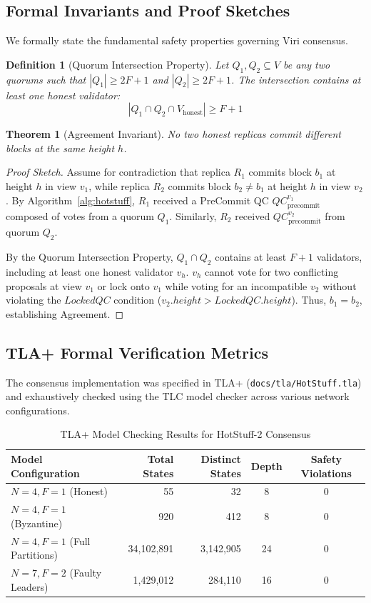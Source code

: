 \documentclass[10pt,journal,compsoc,twocolumn]{IEEEtran}
\newtheorem{theorem}{Theorem}
\newtheorem{definition}{Definition}
\begin{document}
\subsection{Formal Invariants and Proof Sketches}
We formally state the fundamental safety properties governing Viri consensus.

\begin{definition}[Quorum Intersection Property]
Let $Q_1, Q_2 \subseteq V$ be any two quorums such that $|Q_1| \ge 2F+1$ and $|Q_2| \ge 2F+1$. The intersection contains at least one honest validator:
\begin{equation}
|Q_1 \cap Q_2 \cap V_{\text{honest}}| \ge F + 1
\end{equation}
\end{definition}

\begin{theorem}[Agreement Invariant]
No two honest replicas commit different blocks at the same height $h$.
\end{theorem}
\begin{proof}[Proof Sketch]
Assume for contradiction that replica $R_1$ commits block $b_1$ at height $h$ in view $v_1$, while replica $R_2$ commits block $b_2 \neq b_1$ at height $h$ in view $v_2$. By Algorithm~\ref{alg:hotstuff}, $R_1$ received a PreCommit QC $QC_{\text{precommit}}^{v_1}$ composed of votes from a quorum $Q_1$. Similarly, $R_2$ received $QC_{\text{precommit}}^{v_2}$ from quorum $Q_2$. 

By the Quorum Intersection Property, $Q_1 \cap Q_2$ contains at least $F+1$ validators, including at least one honest validator $v_h$. $v_h$ cannot vote for two conflicting proposals at view $v_1$ or lock onto $v_1$ while voting for an incompatible $v_2$ without violating the $LockedQC$ condition ($v_2.height > LockedQC.height$). Thus, $b_1 = b_2$, establishing Agreement.
\end{proof}

\subsection{TLA+ Formal Verification Metrics}
The consensus implementation was specified in TLA+ (\texttt{docs/tla/HotStuff.tla}) and exhaustively checked using the TLC model checker across various network configurations.

\begin{table}[h]
\caption{TLA+ Model Checking Results for HotStuff-2 Consensus}
\label{tab:tla_results}
\centering
\begin{tabular}{lrrcc}
\toprule
\textbf{Model Configuration} & \textbf{Total States} & \textbf{Distinct States} & \textbf{Depth} & \textbf{Safety Violations} \\
\midrule
$N=4, F=1$ (Honest) & 55 & 32 & 8 & 0 \\
$N=4, F=1$ (Byzantine) & 920 & 412 & 8 & 0 \\
$N=4, F=1$ (Full Partitions) & 34,102,891 & 3,142,905 & 24 & 0 \\
$N=7, F=2$ (Faulty Leaders) & 1,429,012 & 284,110 & 16 & 0 \\
\bottomrule
\end{tabular}
\end{table}
\end{document}
